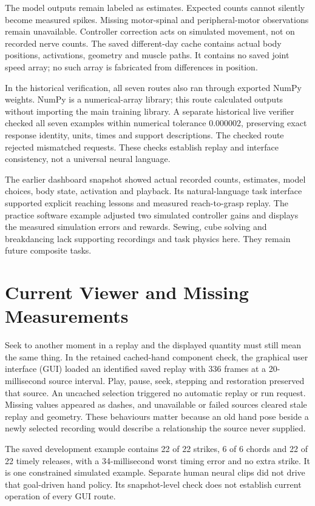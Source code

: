 The model outputs remain labeled as estimates. Expected counts cannot silently
become measured spikes. Missing motor-spinal and peripheral-motor observations
remain unavailable. Controller correction acts on simulated movement, not on
recorded nerve counts. The saved different-day cache contains actual body
positions, activations, geometry and muscle paths. It contains no saved joint
speed array; no such array is fabricated from differences in position.

In the historical verification, all seven routes also ran through exported NumPy weights. NumPy is a numerical-array library; this route calculated outputs without importing the main training library. A separate historical live verifier checked all seven examples within numerical tolerance 0.000002, preserving exact response identity, units, times and support descriptions. The checked route rejected mismatched requests. These checks establish replay and interface consistency, not a universal neural language.

The earlier dashboard snapshot showed actual recorded counts, estimates, model choices, body
state, activation and playback. Its natural-language task interface supported
explicit reaching lessons and measured reach-to-grasp replay. The practice
software example adjusted two simulated controller gains and displays the measured
simulation errors and rewards. Sewing, cube solving and breakdancing lack
supporting recordings and task physics here. They remain future composite tasks.

\section{Current Viewer and Missing Measurements}

Seek to another moment in a replay and the displayed quantity must still mean the same thing. In the retained cached-hand component check, the graphical user interface (GUI) loaded an identified saved replay with 336 frames at a 20-millisecond source interval. Play, pause, seek, stepping and restoration preserved that source. An uncached selection triggered no automatic replay or run request. Missing values appeared as dashes, and unavailable or failed sources cleared stale replay and geometry. These behaviours matter because an old hand pose beside a newly selected recording would describe a relationship the source never supplied.

The saved development example contains 22 of 22 strikes, 6 of 6 chords and 22 of 22 timely releases, with a 34-millisecond worst timing error and no extra strike. It is one constrained simulated example. Separate human neural clips did not drive that goal-driven hand policy. Its snapshot-level check does not establish current operation of every GUI route.

